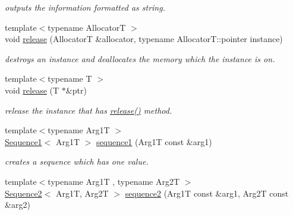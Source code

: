 \begin{DoxyCompactItemize}
\begin{DoxyCompactList}\small\item\em outputs the information formatted as string. \end{DoxyCompactList}\item 
\hypertarget{namespacehryky_a9bdf380c3703ef316b807edae92a930a}{{\footnotesize template$<$typename Allocator\-T $>$ }\\void \hyperlink{namespacehryky_a9bdf380c3703ef316b807edae92a930a}{release} (Allocator\-T \&allocator, typename Allocator\-T\-::pointer instance)}\label{namespacehryky_a9bdf380c3703ef316b807edae92a930a}

\begin{DoxyCompactList}\small\item\em destroys an instance and deallocates the memory which the instance is on. \end{DoxyCompactList}\item 
{\footnotesize template$<$typename T $>$ }\\void \hyperlink{namespacehryky_a23f2789a7915f2abfc21c0fed0c772b7}{release} (T $\ast$\&ptr)
\begin{DoxyCompactList}\small\item\em release the instance that has \hyperlink{namespacehryky_a9bdf380c3703ef316b807edae92a930a}{release()} method. \end{DoxyCompactList}\item 
\hypertarget{namespacehryky_a7f53e66b99b4eadc301227b9330ff1af}{{\footnotesize template$<$typename Arg1\-T $>$ }\\\hyperlink{classhryky_1_1_sequence1}{Sequence1}$<$ Arg1\-T $>$ \hyperlink{namespacehryky_a7f53e66b99b4eadc301227b9330ff1af}{sequence1} (Arg1\-T const \&arg1)}\label{namespacehryky_a7f53e66b99b4eadc301227b9330ff1af}

\begin{DoxyCompactList}\small\item\em creates a sequence which has one value. \end{DoxyCompactList}\item 
\hypertarget{namespacehryky_af306f38c62df81dd0dc791c0ee2665b2}{{\footnotesize template$<$typename Arg1\-T , typename Arg2\-T $>$ }\\\hyperlink{classhryky_1_1_sequence2}{Sequence2}$<$ Arg1\-T, Arg2\-T $>$ \hyperlink{namespacehryky_af306f38c62df81dd0dc791c0ee2665b2}{sequence2} (Arg1\-T const \&arg1, Arg2\-T const \&arg2)}\label{namespacehryky_af306f38c62df81dd0dc791c0ee2665b2}


\end{DoxyCompactItemize}
